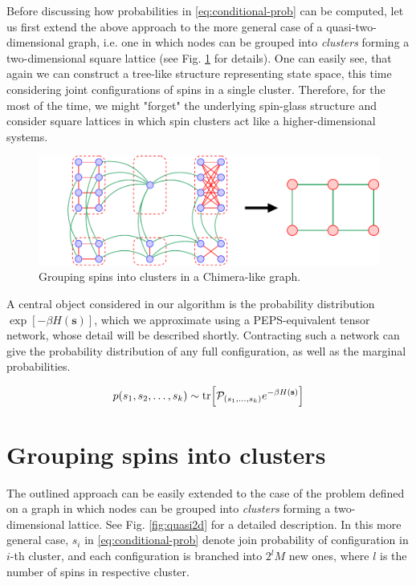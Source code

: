Before discussing how probabilities in \eqref{eq:conditional-prob} can be
computed, let us first extend the above approach to the more general case of a
quasi-two-dimensional graph, i.e. one in which nodes can be grouped into
\emph{clusters} forming a two-dimensional square lattice (see Fig.
\ref{fig:clustering} for details). One can easily see, that again we can construct
a tree-like structure representing state space, this time considering joint
configurations of spins in a single cluster. Therefore, for the most of the
time, we might "forget" the underlying spin-glass structure and consider square
lattices in which spin clusters act like a higher-dimensional systems.

\begin{figure}
  \includegraphics[width=\textwidth]{figures/clustering}
  \caption{Grouping spins into clusters in a Chimera-like graph.}
  \label{fig:clustering}
\end{figure}

A central object considered in our algorithm is the probability distribution
$\exp[-\beta H(\mathbf{s})]$, which we approximate using a PEPS-equivalent
tensor network, whose detail will be described shortly. Contracting such a
network can give the probability distribution of any full configuration, as
well as the marginal probabilities.

\begin{equation}
  p(s_1, s_2, \ldots, s_k) \sim \tr[\mathcal{P}_{(s_1, \ldots, s_k)} e^{-\beta H(\mathbf{s})}]
\end{equation}

\section{Grouping spins into clusters}
The outlined approach can be easily extended to the case of the problem defined
on a graph in which nodes can be grouped into \emph{clusters} forming a
two-dimensional lattice. See Fig. \ref{fig:quasi2d} for a detailed description.
In this more general case, $s_i$ in \eqref{eq:conditional-prob} denote join
probability of configuration in $i$-th cluster, and each configuration is
branched into $2^lM$ new ones, where $l$ is the number of spins in respective
cluster.


